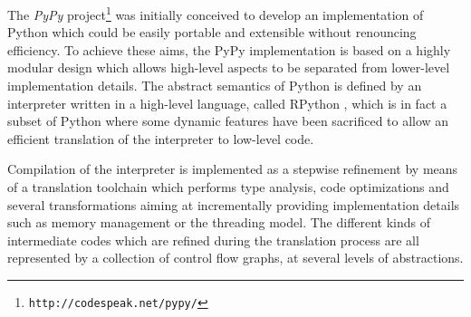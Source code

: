 
The \emph{PyPy} project\footnote{\texttt{http://codespeak.net/pypy/}}
\cite{RigoPedroni06} was initially conceived to develop an implementation of Python which
could be easily portable and extensible without renouncing efficiency.
To achieve these aims, the PyPy implementation is based on a highly
modular design which allows high-level aspects
to be separated from lower-level implementation details.
The abstract semantics of Python is defined by an interpreter written
in a high-level language, called RPython \cite{AACM-DLS07}, which is in fact a subset of
Python where some dynamic features have been sacrificed to allow an
efficient translation of the interpreter to low-level code.

Compilation of the interpreter is implemented as a stepwise
refinement by means of a translation toolchain which performs type
analysis, code optimizations and several transformations aiming at 
incrementally providing implementation details such as memory management or the threading model.
The different kinds of intermediate codes  which are refined 
during the translation process are all represented by a collection of control flow graphs,
at several levels of abstractions.

